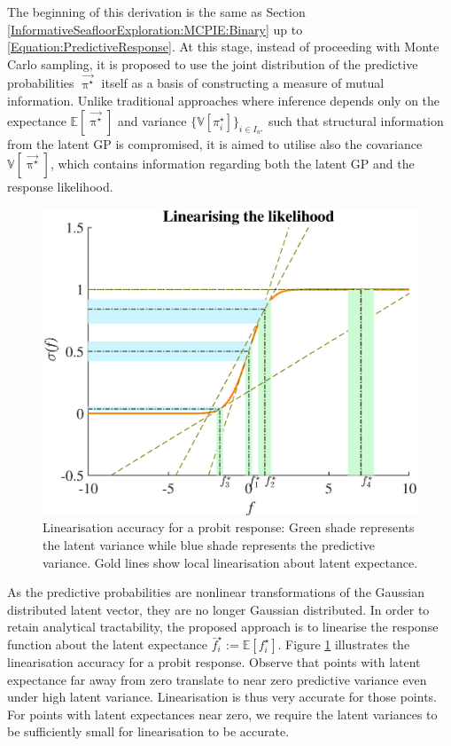 			The beginning of this derivation is the same as Section \ref{InformativeSeafloorExploration:MCPIE:Binary} up to \eqref{Equation:PredictiveResponse}. At this stage, instead of proceeding with Monte Carlo sampling, it is proposed to use the joint distribution of the predictive probabilities $\vec{\uppi^{\star}}$ itself as a basis of constructing a measure of mutual information. Unlike traditional approaches where inference depends only on the expectance $\mathbb{E}[\vec{\uppi^{\star}}]$ and variance $\{\mathbb{V}[\pi^{\star}_{i}]\}_{i \in I_{n^{\star}}}$ such that structural information from the latent GP is compromised, it is aimed to utilise also the covariance $\mathbb{V}[\vec{\uppi^{\star}}]$, which contains information regarding both the latent GP and the response likelihood.
		
			\begin{figure}[!htbp]
				\centering
					\includegraphics[width = 0.6\linewidth]{Figures/linearisation.eps}
				\caption{Linearisation accuracy for a probit response: Green shade represents the latent variance while blue shade represents the predictive variance. Gold lines show local linearisation about latent expectance.}
				\label{Figure:Linearisation}
			\end{figure}
				
			As the predictive probabilities are nonlinear transformations of the Gaussian distributed latent vector, they are no longer Gaussian distributed. In order to retain analytical tractability, the proposed approach is to linearise the response function about the latent expectance $\bar{f}^{\star}_{i} := \mathbb{E}[f^{\star}_{i}]$. Figure \ref{Figure:Linearisation} illustrates the linearisation accuracy for a probit response. Observe that points with latent expectance far away from zero translate to near zero predictive variance even under high latent variance. Linearisation is thus very accurate for those points. For points with latent expectances near zero, we require the latent variances to be sufficiently small for linearisation to be accurate.
			
